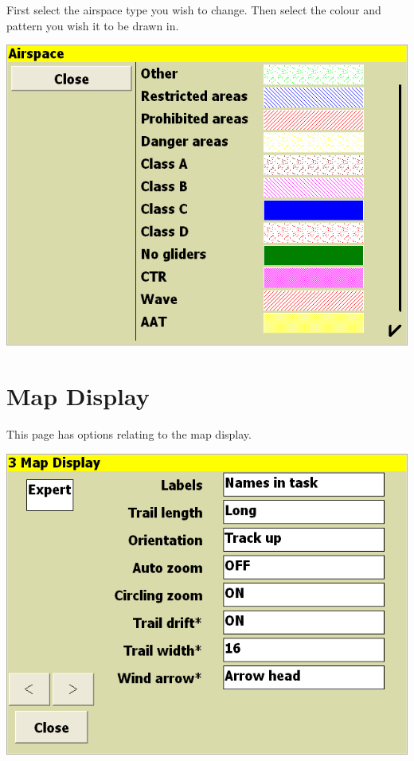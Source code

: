\documentclass[a4paper,12pt]{refrep}
\begin{document}
First select the airspace type you wish to change.  Then select the
colour and pattern you wish it to be drawn in.

\begin{center}
\includegraphics[angle=0,width=\linewidth,keepaspectratio='true']{figures/config-airspacecolors.png}
\end{center}


\clearpage
\section{Map Display}\label{sec:map-display}

This page has options relating to the map display.

\begin{center}
\includegraphics[angle=0,width=\linewidth,keepaspectratio='true']{figures/config-2.png}
\end{center}
\end{document}
